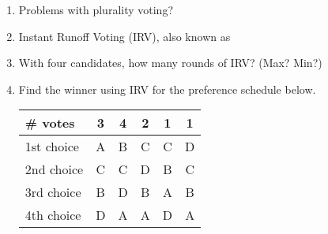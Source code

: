 \documentclass[12pt]{article}
\begin{document}
\begin{enumerate}
%
%
%
%
%
%
\newpage

\item Problems with plurality voting?

\vspace{1in}
\item Instant Runoff Voting (IRV), also known as \hrulefill
\vspace{2.5in}


\item With four candidates, how many rounds of IRV? (Max? Min?)
\vspace{1in}

\item Find the winner using IRV for the preference schedule below.\\
\begin{tabular}{l || c |c|c|c|c}
\# votes&3&4&2&1&1\\
\hline
1st choice&A&B&C&C&D\\
2nd choice&C&C&D&B&C\\
3rd choice&B&D&B&A&B\\
4th choice&D&A&A&D&A\\
\end{tabular}


\end{enumerate}
\end{document}
